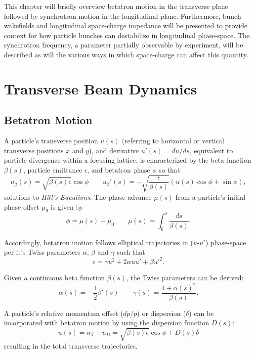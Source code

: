 This chapter will briefly overview betatron motion in the transverse plane followed by synchrotron motion in the longitudinal plane. Furthermore, bunch wakefields and longitudinal space-charge impedance will be presented to provide context for how particle bunches can destabilize in longitudinal phase-space. The synchrotron frequency, a parameter partially observable by experiment, will be described as will the various ways in which space-charge can affect this quantity.

\section{Transverse Beam Dynamics}

\subsection{Betatron Motion}

A particle's transverse position $u(s)$ (referring to horizontal or vertical transverse positions $x$ and $y$), and derivative $u'(s)=du/ds$, equivalent to particle divergence within a focusing lattice, is characterized by the beta function $\beta(s)$, particle emittance $\epsilon$, and betatron phase $\phi$ so that 
\begin{equation}
    u_\beta(s)=\sqrt{\beta(s)\epsilon}\cos\phi \qquad u_\beta'(s)=-\sqrt{\frac{\epsilon}{\beta(s)}}\left(\alpha(s)\cos\phi+\sin\phi\right)
    \label{eq:hills_equations},
\end{equation} solutions to \textit{Hill's Equations}. The phase advance $\mu(s)$ from a particle's initial phase offset $\mu_0$ is given by
$$\phi = \mu(s) + \mu_0 \qquad \mu(s) = \int_0^s\frac{ds}{\beta(s)}.$$

Accordingly, betatron motion follows elliptical trajectories in ($u$-$u'$) phase-space per it's Twiss parameters $\alpha$, $\beta$ and $\gamma$ \cite{courant_theory_1958} such that $$\epsilon = \gamma u^2 + 2 \alpha u u' + \beta u'^2.$$

Given a continuous beta function $\beta(s)$, the Twiss parameters can be derived: $$\alpha(s) = -\frac{1}{2}\beta'(s) \qquad \gamma(s) = \frac{1+\alpha(s)^2}{\beta(s)}.$$

A particle's relative momentum offset ($dp/p$) or dispersion ($\delta$) can be incorporated with betatron motion by using the dispersion function $D(s)$: $$u(s) = u_\beta + u_D= \sqrt{\beta(s)\epsilon}\cos\phi + D(s)\delta$$ resulting in the total transverse trajectories.

